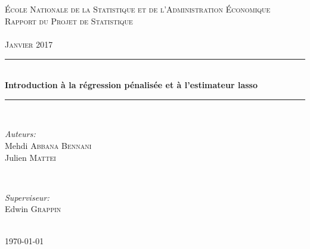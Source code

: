 \documentclass{article}
\begin{document}

\begin{titlepage}

\newcommand{\HRule}{\rule{\linewidth}{0.5mm}} %
\setlength{\topmargin}{0in}
\center %
 
\begin{minipage}{0.4\textwidth}
\begin{flushleft} \large
\hspace*{-0.5cm}
\end{flushleft}
\end{minipage}
~
\begin{minipage}{0.5\textwidth}
\begin{flushright} \large
\hspace*{1.5cm}
\end{flushright}
\end{minipage}\\[1cm]


\textsc{\Large École Nationale de la Statistique et de l'Administration Économique}\\[1.5cm] 
\textsc{{\LARGE Rapport du Projet de Statistique}\\~\\Janvier 2017}\\[1cm]

\HRule \\[1cm]
{ \huge \bfseries Introduction à la régression pénalisée et à l'estimateur lasso}\\[0.4cm] %
\HRule \\[1cm]
 
\begin{minipage}{0.5\textwidth}
\begin{flushleft} \large
\emph{Auteurs:}\\
Mehdi \textsc{Abbana Bennani} \\
Julien \textsc{Mattei} \\
\end{flushleft}
\end{minipage}
~
\begin{minipage}{0.4\textwidth}
\begin{flushright} \large
\emph{Superviseur:} \\
Edwin \textsc{Grappin} \\[0.5cm] 
\end{flushright}
\end{minipage}\\[1.2cm]

{\large \today}\\[0.5cm] %

\vfill %
\end{titlepage}
\end{document}
